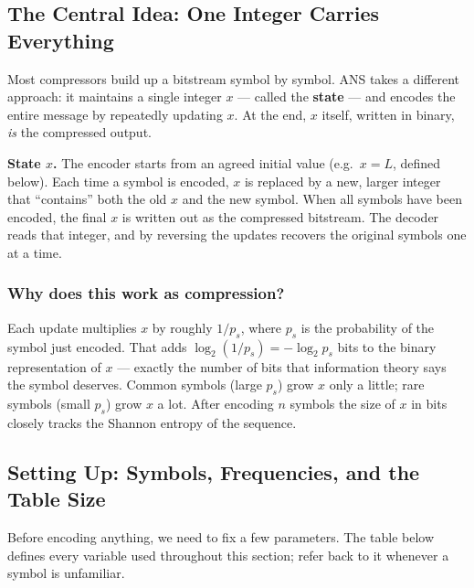 \subsection{The Central Idea: One Integer Carries Everything}

Most compressors build up a bitstream symbol by symbol.  ANS
takes a different approach: it maintains a single integer
$x$ — called the \textbf{state} — and encodes the entire
message by repeatedly updating $x$.  At the end, $x$ itself,
written in binary, \emph{is} the compressed output.

\begin{definitionbox}
\textbf{State $x$.}  The encoder starts from an agreed
initial value (e.g.\ $x = L$, defined below).  Each time a
symbol is encoded, $x$ is replaced by a new, larger integer
that ``contains'' both the old $x$ and the new symbol.  When
all symbols have been encoded, the final $x$ is written out
as the compressed bitstream.  The decoder reads that integer,
and by reversing the updates recovers the original symbols
one at a time.
\end{definitionbox}

\subsubsection*{Why does this work as compression?}

Each update multiplies $x$ by roughly $1/p_s$, where $p_s$
is the probability of the symbol just encoded.  That adds
$\log_2(1/p_s) = -\log_2 p_s$ bits to the binary
representation of $x$ --- exactly the number of bits that
information theory says the symbol deserves.  Common symbols
(large $p_s$) grow $x$ only a little; rare symbols (small
$p_s$) grow $x$ a lot.  After encoding $n$ symbols the size
of $x$ in bits closely tracks the Shannon entropy of the
sequence.

\subsection{Setting Up: Symbols, Frequencies, and the Table Size}

Before encoding anything, we need to fix a few parameters.
The table below defines every variable used throughout this
section; refer back to it whenever a symbol is unfamiliar.

